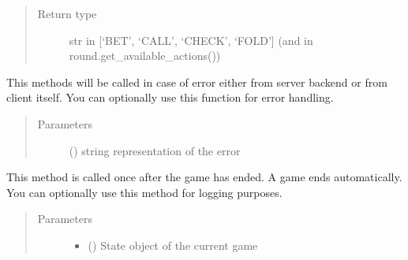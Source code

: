 \documentclass[letterpaper,10pt,english]{sphinxmanual}
\begin{document}
\begin{fulllineitems}
\begin{fulllineitems}
\begin{quote}
\begin{description}
\item[{Return type}] \leavevmode
\sphinxAtStartPar
str in {[}‘BET’, ‘CALL’, ‘CHECK’, ‘FOLD’{]} (and in round.get\_available\_actions())

\end{description}\end{quote}

\end{fulllineitems}


\begin{fulllineitems}
\label{\detokenize{agent:agent.PokerAgent.on_error}}
\pysigstartsignatures
{}
\pysigstopsignatures
\sphinxAtStartPar
This methods will be called in case of error either from server backend or from client itself. You can
optionally use this function for error handling.
\begin{quote}\begin{description}
\item[{Parameters}] \leavevmode
\sphinxAtStartPar
{} () \textendash{} string representation of the error

\end{description}\end{quote}

\end{fulllineitems}


\begin{fulllineitems}
\label{\detokenize{agent:agent.PokerAgent.on_game_end}}
\pysigstartsignatures
{}
\pysigstopsignatures
\sphinxAtStartPar
This method is called once after the game has ended. A game ends automatically. You can optionally use this
method for logging purposes.
\begin{quote}\begin{description}
\item[{Parameters}] \leavevmode\begin{itemize}
\item {} 
\sphinxAtStartPar
{} ({\hyperref[\detokenize{client:client.state.ClientGameState}]{}}) \textendash{} State object of the current game


\end{itemize}
\end{description}
\end{quote}
\end{fulllineitems}
\end{fulllineitems}
\end{document}
